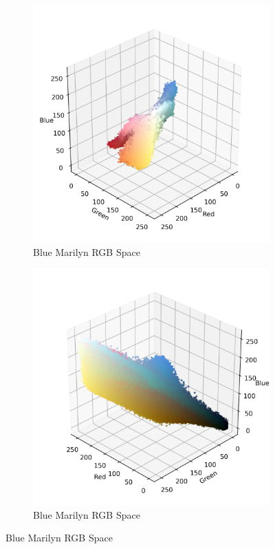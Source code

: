 \documentclass{article}
\begin{document}
\begin{figure}[ht]
  \centering
  \begin{subfigure}{0.45\textwidth}
    \includegraphics[width=\textwidth]{main_files/figure-latex/4_13_blue_marilyn_original_scatter.jpg}
    \caption{Blue Marilyn RGB Space}
    \label{fig:4_13_blue_marilyn_original_scatter}
  \end{subfigure}
  \hfill
  \begin{subfigure}{0.45\textwidth}
    \includegraphics[width=\textwidth]{main_files/figure-latex/4_14_blue_marilyn_original_scatter.jpg}
    \caption{Blue Marilyn RGB Space}
    \label{fig:4_14_blue_marilyn_original_scatter}
  \end{subfigure}
  \label{fig:blue_marilyn_original_scatter_1}
\end{figure}
\end{document}

